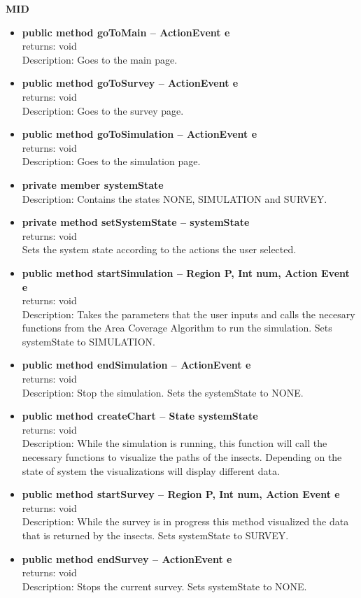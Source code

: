 \documentclass[11pt]{article}
\begin{document}
\textbf{MID}
\begin{itemize}
    \item \textbf{public method goToMain -- ActionEvent e}\\ returns: void \\ Description: Goes to the main page.
    \item \textbf{public method goToSurvey -- ActionEvent e}\\ returns: void \\ Description: Goes to the survey page.
    \item \textbf{public method goToSimulation -- ActionEvent e}\\ returns: void \\ Description: Goes to the simulation page.
    \item \textbf{private member systemState}\\ Description: Contains the states NONE, SIMULATION and SURVEY.
    \item \textbf{private method setSystemState -- systemState}\\ returns: void \\ Sets the system state according to the actions the user selected.
    \item \textbf{public method startSimulation -- Region P, Int num, Action Event e}\\ returns: void \\ Description: Takes the parameters that the user inputs and calls the necesary functions from the Area Coverage Algorithm to run the simulation. Sets systemState to SIMULATION.
    \item \textbf{public method endSimulation -- ActionEvent e}\\ returns: void \\ Description: Stop the simulation. Sets the systemState to NONE.
    \item \textbf{public method createChart -- State systemState}\\ returns: void \\ Description: While the simulation is running, this function will call the necessary functions to visualize the paths of the insects. Depending on the state of system the visualizations will display different data.
    \item \textbf{public method startSurvey -- Region P, Int num, Action Event e}\\ returns: void \\ Description: While the survey is in progress this method visualized the data that is returned by the insects. Sets systemState to SURVEY.
    \item \textbf{public method endSurvey -- ActionEvent e}\\ returns: void \\ Description: Stops the current survey. Sets systemState to NONE.
\end{itemize}
\end{document}
